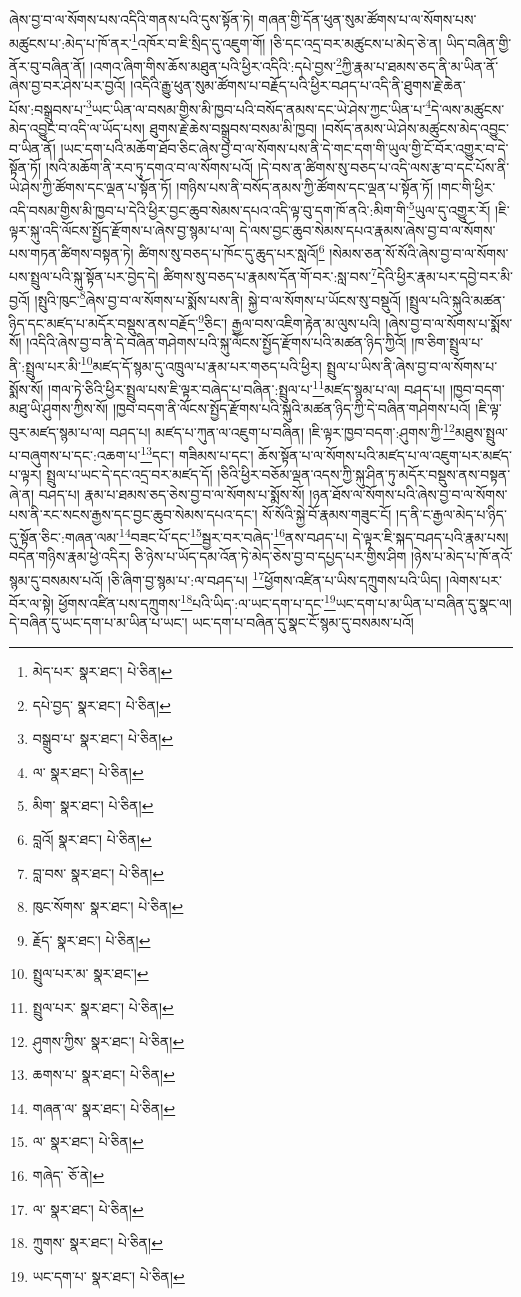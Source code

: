 ཞེས་བྱ་བ་ལ་སོགས་པས་འདིའི་གནས་པའི་དུས་སྟོན་ཏེ། གཞན་གྱི་དོན་ཕུན་སུམ་ཚོགས་པ་ལ་སོགས་པས་མཚུངས་པ་:མེད་པ་ཁོ་ནར་\footnote{མེད་པར་  སྣར་ཐང་།  པེ་ཅིན། }འཁོར་བ་ཇི་སྲིད་དུ་འཇུག་གོ། །ཅི་དང་འདྲ་བར་མཚུངས་པ་མེད་ཅེ་ན། ཡིད་བཞིན་གྱི་ནོར་བུ་བཞིན་ནོ། །འགའ་ཞིག་གིས་ཆོས་མཐུན་པའི་ཕྱིར་འདིའི་:དཔེ་བྱས་\footnote{དཔེ་བྱད་  སྣར་ཐང་།  པེ་ཅིན། }ཀྱི་རྣམ་པ་ཐམས་ཅད་ནི་མ་ཡིན་ནོ་ཞེས་བྱ་བར་ཤེས་པར་བྱའོ། །འདིའི་རྒྱུ་ཕུན་སུམ་ཚོགས་པ་བརྗོད་པའི་ཕྱིར་བཤད་པ་འདི་ནི་ཐུགས་རྗེ་ཆེན་པོས་:བསྒྲུབས་པ་\footnote{བསྒྲུབ་པ་  སྣར་ཐང་།  པེ་ཅིན། }ཡང་ཡིན་ལ་བསམ་གྱིས་མི་ཁྱབ་པའི་བསོད་ནམས་དང་ཡེ་ཤེས་ཀྱང་ཡིན་པ་\footnote{ལ་  སྣར་ཐང་།  པེ་ཅིན། }དེ་ལས་མཚུངས་མེད་འབྱུང་བ་འདི་ལ་ཡོད་པས། ཐུགས་རྗེ་ཆེས་བསྒྲུབས་བསམ་མི་ཁྱབ། །བསོད་ནམས་ཡེ་ཤེས་མཚུངས་མེད་འབྱུང་བ་ཡིན་ནོ། །ཡང་དག་པའི་མཆོག་ཐོབ་ཅིང་ཞེས་བྱ་བ་ལ་སོགས་པས་ནི་དེ་གང་དག་གི་ཡུལ་གྱི་ངོ་བོར་འགྱུར་བ་དེ་སྟོན་ཏོ། །སའི་མཆོག་ནི་རབ་ཏུ་དགའ་བ་ལ་སོགས་པའོ། །དེ་བས་ན་ཚིགས་སུ་བཅད་པ་འདི་ལས་རྩ་བ་དང་པོས་ནི་ཡེ་ཤེས་ཀྱི་ཚོགས་དང་ལྡན་པ་སྟོན་ཏོ། །གཉིས་པས་ནི་བསོད་ནམས་ཀྱི་ཚོགས་དང་ལྡན་པ་སྟོན་ཏོ། །གང་གི་ཕྱིར་འདི་བསམ་གྱིས་མི་ཁྱབ་པ་དེའི་ཕྱིར་བྱང་ཆུབ་སེམས་དཔའ་འདི་ལྟ་བུ་དག་ཁོ་ནའི་:མིག་གི་\footnote{མིག་  སྣར་ཐང་།  པེ་ཅིན། }ཡུལ་དུ་འགྱུར་རོ། །ཇི་ལྟར་སྐུ་འདི་ལོངས་སྤྱོད་རྫོགས་པ་ཞེས་བྱ་སྙམ་པ་ལ། དེ་ལས་བྱང་ཆུབ་སེམས་དཔའ་རྣམས་ཞེས་བྱ་བ་ལ་སོགས་པས་གཏན་ཚིགས་བསྟན་ཏེ། ཚིགས་སུ་བཅད་པ་ཁོང་དུ་ཆུད་པར་སླའོ།\footnote{བླའོ།  སྣར་ཐང་།  པེ་ཅིན། } །སེམས་ཅན་སོ་སོའི་ཞེས་བྱ་བ་ལ་སོགས་པས་སྤྲུལ་པའི་སྐུ་སྟོན་པར་བྱེད་དེ། ཚིགས་སུ་བཅད་པ་རྣམས་དོན་གོ་བར་:སླ་བས་\footnote{བླ་བས་  སྣར་ཐང་།  པེ་ཅིན། }དེའི་ཕྱིར་རྣམ་པར་དབྱེ་བར་མི་བྱའོ། །སྤུའི་ཁུང་\footnote{ཁུང་སོགས་  སྣར་ཐང་།  པེ་ཅིན། }ཞེས་བྱ་བ་ལ་སོགས་པ་སྨོས་པས་ནི། སྐྱེ་བ་ལ་སོགས་པ་ཡོངས་སུ་བསྡུའོ། །སྤྲུལ་པའི་སྐུའི་མཚན་ཉིད་དང་མཛད་པ་མདོར་བསྡུས་ནས་བརྗོད་\footnote{རྗོད་  སྣར་ཐང་།  པེ་ཅིན། }ཅིང་། རྒྱལ་བས་འཇིག་རྟེན་མ་ལུས་པའི། །ཞེས་བྱ་བ་ལ་སོགས་པ་སྨོས་སོ། །འདིའི་ཞེས་བྱ་བ་ནི་དེ་བཞིན་གཤེགས་པའི་སྐུ་ལོངས་སྤྱོད་རྫོགས་པའི་མཚན་ཉིད་ཀྱིའོ། །ཁ་ཅིག་སྤྲུལ་པ་ནི་:སྤྲུལ་པར་མི་\footnote{སྤྲུལ་པར་མ་  སྣར་ཐང་། }མཛད་དོ་སྙམ་དུ་འཁྲུལ་པ་རྣམ་པར་གཅད་པའི་ཕྱིར། སྤྲུལ་པ་ཡིས་ནི་ཞེས་བྱ་བ་ལ་སོགས་པ་སྨོས་སོ། །གལ་ཏེ་ཅིའི་ཕྱིར་སྤྲུལ་པས་ཇི་ལྟར་བཞེད་པ་བཞིན་:སྤྲུལ་པ་\footnote{སྤྲུལ་པར་  སྣར་ཐང་།  པེ་ཅིན། }མཛད་སྙམ་པ་ལ། བཤད་པ། །ཁྱབ་བདག་མཐུ་ཡི་ཤུགས་ཀྱིས་སོ། །ཁྱབ་བདག་ནི་ལོངས་སྤྱོད་རྫོགས་པའི་སྐུའི་མཚན་ཉིད་ཀྱི་དེ་བཞིན་གཤེགས་པའོ། །ཇི་ལྟ་བུར་མཛད་སྙམ་པ་ལ། བཤད་པ། མཛད་པ་ཀུན་ལ་འཇུག་པ་བཞིན། །ཇི་ལྟར་ཁྱབ་བདག་:ཤུགས་ཀྱི་\footnote{ཤུགས་ཀྱིས་  སྣར་ཐང་།  པེ་ཅིན། }མཐུས་སྤྲུལ་པ་བཞུགས་པ་དང་:འཆག་པ་\footnote{ཆགས་པ་  སྣར་ཐང་།  པེ་ཅིན། }དང་། གཟིམས་པ་དང་། ཆོས་སྟོན་པ་ལ་སོགས་པའི་མཛད་པ་ལ་འཇུག་པར་མཛད་པ་ལྟར། སྤྲུལ་པ་ཡང་དེ་དང་འདྲ་བར་མཛད་དོ། །ཅིའི་ཕྱིར་བཅོམ་ལྡན་འདས་ཀྱི་སྐུ་ཤིན་ཏུ་མདོར་བསྡུས་ནས་བསྟན་ཞེ་ན། བཤད་པ། རྣམ་པ་ཐམས་ཅད་ཅེས་བྱ་བ་ལ་སོགས་པ་སྨོས་སོ། །ཉན་ཐོས་ལ་སོགས་པའི་ཞེས་བྱ་བ་ལ་སོགས་པས་ནི་རང་སངས་རྒྱས་དང་བྱང་ཆུབ་སེམས་དཔའ་དང་། སོ་སོའི་སྐྱེ་བོ་རྣམས་གཟུང་ངོ། །ད་ནི་ང་རྒྱལ་མེད་པ་ཉིད་དུ་སྟོན་ཅིང་:གཞན་ལམ་\footnote{གཞན་ལ་  སྣར་ཐང་།  པེ་ཅིན། }བཟང་པོ་དང་\footnote{ལ་  སྣར་ཐང་།  པེ་ཅིན། }སྦྱར་བར་བཞེད་\footnote{གཞེད་  ཅོ་ནེ། }ནས་བཤད་པ། དེ་ལྟར་ཇི་སྐད་བཤད་པའི་རྣམ་པས། བདེན་གཉིས་རྣམ་ཕྱེ་འདིར། ཅི་ཉེས་པ་ཡོད་དམ་འོན་ཏེ་མེད་ཅེས་བྱ་བ་དཔྱད་པར་གྱིས་ཤིག །ཉེས་པ་མེད་པ་ཁོ་ནའོ་སྙམ་དུ་བསམས་པའོ། །ཅི་ཞིག་བྱ་སྙམ་པ་:ལ་བཤད་པ། \footnote{ལ་  སྣར་ཐང་།  པེ་ཅིན། }ཕྱོགས་འཛིན་པ་ཡིས་དཀྲུགས་པའི་ཡིད། །ལེགས་པར་བོར་ལ་སྟེ། ཕྱོགས་འཛིན་པས་དཀྲུགས་\footnote{ཀྲུགས་  སྣར་ཐང་།  པེ་ཅིན། }པའི་ཡིད་:ལ་ཡང་དག་པ་དང་\footnote{ཡང་དག་པ་  སྣར་ཐང་།  པེ་ཅིན། }ཡང་དག་པ་མ་ཡིན་པ་བཞིན་དུ་སྣང་ལ། དེ་བཞིན་དུ་ཡང་དག་པ་མ་ཡིན་པ་ཡང་། ཡང་དག་པ་བཞིན་དུ་སྣང་ངོ་སྙམ་དུ་བསམས་པའོ། 